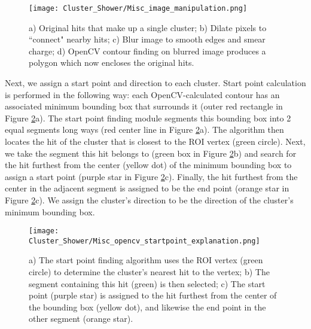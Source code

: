 \begin{figure}[H]
\centering
\texttt{[image: Cluster\_Shower/Misc\_image\_manipulation.png]}
\caption{ a) Original hits that make up a single cluster; b) Dilate pixels to ``connect" nearby hits; c) Blur image to smooth edges and smear charge; d) OpenCV contour finding on blurred image produces a polygon which now encloses the original hits.}
\label{fig:sbc}
\end{figure}



\par Next, we assign a start point and direction to each cluster. Start point calculation is performed in the following way: each OpenCV-calculated contour has an associated minimum bounding box \cite{bib:minAreaRect} that surrounds it (outer red rectangle in Figure \ref{fig:misc_opencv_startpoint}a). The start point finding module segments this bounding box into 2 equal segments long ways (red center line in Figure \ref{fig:misc_opencv_startpoint}a). The algorithm then locates the hit of the cluster that is closest to the ROI vertex (green circle).  Next, we take the segment this hit belongs to (green box in Figure \ref{fig:misc_opencv_startpoint}b) and search for the hit furthest from the center (yellow dot) of the minimum bounding box to assign a start point (purple star in Figure \ref{fig:misc_opencv_startpoint}c). Finally, the hit furthest from the center in the adjacent segment is assigned to be the end point (orange star in Figure \ref{fig:misc_opencv_startpoint}c). We assign the cluster's direction to be the direction of the cluster's minimum bounding box.

\begin{figure}[h!]
\centering
\texttt{[image: Cluster\_Shower/Misc\_opencv\_startpoint\_explanation.png]}
\caption{ a) The start point finding algorithm uses the ROI vertex (green circle) to determine the
cluster’s nearest hit to the vertex; b) The segment containing this hit (green) is then selected; c) The
start point (purple star) is assigned to the hit furthest from the center of the bounding box (yellow
dot), and likewise the end point in the other segment (orange star). }
\label{fig:misc_opencv_startpoint}
\end{figure}

